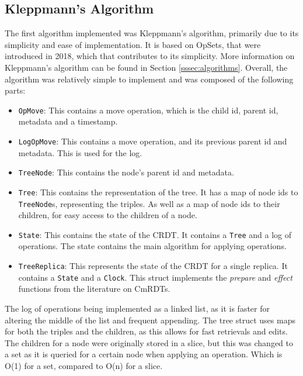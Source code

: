 \documentclass[12pt]{report}
\begin{document}
\subsection{Kleppmann's Algorithm}
The first algorithm implemented was Kleppmann's algorithm, primarily due to its simplicity and ease of implementation. It is based on OpSets, that were introduced in 2018\cite{https://doi.org/10.48550/arxiv.1805.04263}, which that contributes to its simplicity. More information on Kleppmann's algorithm can be found in Section \ref{sssec:algorithms}. Overall, the algorithm was relatively simple to implement and was composed of the following parts:
\begin{itemize}
    \item \texttt{OpMove}: This contains a move operation, which is the child id, parent id, metadata and a timestamp.
    \item \texttt{LogOpMove}: This contains a move operation, and its previous parent id and metadata. This is used for the log.
    \item \texttt{TreeNode}: This contains the node's parent id and metadata.
    \item \texttt{Tree}: This contains the representation of the tree. It has a map of node ids to \texttt{TreeNode}s, representing the triples. As well as a map of node ids to their children, for easy access to the children of a node.
    \item \texttt{State}: This contains the state of the CRDT. It contains a \texttt{Tree} and a log of operations. The state contains the main algorithm for applying operations.
    \item \texttt{TreeReplica}: This represents the state of the CRDT for a single replica. It contains a \texttt{State} and a \texttt{Clock}. This struct implements the \textit{prepare} and \textit{effect} functions from the literature on CmRDTs.
\end{itemize}

The log of operations being implemented as a linked list, as it is faster for altering the middle of the list and frequent appending. The tree struct uses maps for both the triples and the children, as this allows for fast retrievals and edits. The children for a node were originally stored in a slice, but this was changed to a set as it is queried for a certain node when applying an operation. Which is O(1) for a set, compared to O(n) for a slice. \par
\end{document}
